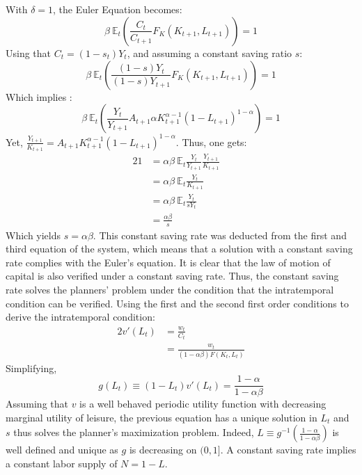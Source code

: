 \documentclass[12pt]{article}
\begin{document}
\subsection{}
With $\delta = 1$, the Euler Equation becomes: 
\begin{equation*}
   \beta~\mathbb{E}_t \left( \frac{C_t}{C_{t+1}} F_K(K_{t+1}, L_{t+1}) \right) = 1
\end{equation*}
Using that $C_t = (1 - s_t) Y_t$, and assuming a constant saving ratio $s$: 
\begin{equation*}
   \beta~\mathbb{E}_t \left( \frac{(1 - s)Y_t}{(1-s)Y_{t+1}}  F_K(K_{t+1}, L_{t+1}) \right) = 1
\end{equation*}
Which implies :
\begin{equation*}
   \beta~\mathbb{E}_t \left( \frac{Y_t}{Y_{t+1}} A_{t+1} \alpha K_{t+1}^{\alpha - 1} (1 - L_{t+1})^{1 - \alpha} \right) = 1
\end{equation*}
Yet, $\displaystyle \frac{Y_{t+1}}{K_{t+1}}= A_{t+1} K_{t+1}^{\alpha-1} (1 - L_{t+1})^{1 - \alpha}$. 
Thus, one gets:
\begin{alignat*}{2}
    1   &= \alpha \beta~\mathbb{E}_t\frac{Y_t}{Y_{t+1}} \frac{Y_{t+1}}{K_{t+1}} \quad\\
        &= \alpha \beta~\mathbb{E}_t \frac{Y_t}{K_{t+1}} \quad\\
        &= \alpha \beta~\mathbb{E}_t \frac{Y_t}{sY_t} \quad\\
        &= \frac{\alpha \beta}{s} \quad
\end{alignat*}
Which yields $s = \alpha \beta$.\newline\newline
This constant saving rate was deducted from the first and third equation of the system, which means that a solution with a constant saving rate complies with the Euler's equation. It is clear that the law of motion of capital is also verified under a constant saving rate. Thus, the constant saving rate solves the planners' problem under the condition that the intratemporal condition can be verified.\newline
Using the first and the second first order conditions to derive the intratemporal condition:
\begin{alignat*}{2}
    v'(L_t) &= \frac{w_t}{C_t} \quad\\
            &= \frac{w_t}{(1-\alpha \beta)F(K_t, L_t)}
\end{alignat*}
Simplifying,
\begin{equation*}
    g(L_t) \equiv (1-L_t)v'(L_t) = \frac{1 - \alpha}{1 - \alpha \beta}
\end{equation*}
Assuming that $v$ is a well behaved periodic utility function with decreasing marginal utility of leisure, the previous equation has a unique solution in $L_t$ and $s$ thus solves the planner's maximization problem. Indeed, $L \equiv g^{-1}\left( \frac{1 - \alpha}{1 - \alpha \beta} \right)$ is well defined and unique as $g$ is decreasing on $(0, 1]$.\newline
A constant saving rate implies a constant labor supply of $N = 1 - L$.
\end{document}
